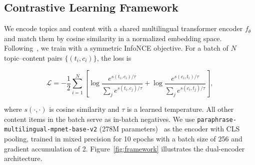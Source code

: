 \documentclass[applsci,article,submit,pdftex,moreauthors]{Definitions/mdpi}
\begin{document}
\subsection{Contrastive Learning Framework}

We encode topics and content with a shared multilingual transformer encoder $f_\theta$ and match them by cosine similarity in a normalized embedding space. Following~\cite{habel2023,oord2018cpc}, we train with a symmetric InfoNCE objective. For a batch of $N$ topic--content pairs $\{(t_i, c_i)\}$, the loss is
\begin{linenomath}
\begin{equation}
\mathcal{L} = -\frac{1}{2}\sum_{i=1}^{N}\left[\log\frac{e^{s(t_i,c_i)/\tau}}{\sum_{j} e^{s(t_i,c_j)/\tau}} + \log\frac{e^{s(c_i,t_i)/\tau}}{\sum_{j} e^{s(c_i,t_j)/\tau}}\right],
\end{equation}
\end{linenomath}
where $s(\cdot,\cdot)$ is cosine similarity and $\tau$ is a learned temperature. All other content items in the batch serve as in-batch negatives. We use \texttt{paraphrase-multilingual-mpnet-base-v2} (278M parameters)~\cite{mpnet} as the encoder with CLS pooling, trained in mixed precision for 10 epochs with a batch size of 256 and gradient accumulation of 2. Figure~\ref{fig:framework} illustrates the dual-encoder architecture.
\end{document}
